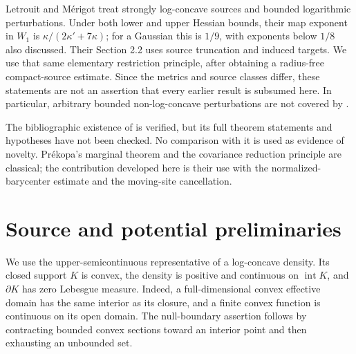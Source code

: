\documentclass[11pt]{article}
\numberwithin{equation}{section}
\theoremstyle{remark}
\newcommand{\interior}{\operatorname{int}}
\begin{document}
Letrouit and M\'erigot \cite[Theorem 1.4]{LetrouitMerigot2026} treat strongly log-concave sources and bounded logarithmic perturbations. Under both lower and upper Hessian bounds, their map exponent in $W_1$ is $\kappa/(2\kappa'+7\kappa)$; for a Gaussian this is $1/9$, with exponents below $1/8$ also discussed. Their Section 2.2 uses source truncation and induced targets. We use that same elementary restriction principle, after obtaining a radius-free compact-source estimate. Since the metrics and source classes differ, these statements are not an assertion that every earlier result is subsumed here. In particular, arbitrary bounded non-log-concave perturbations are not covered by .

The bibliographic existence of \cite{Merigot2026} is verified, but its full theorem statements and hypotheses have not been checked. No comparison with it is used as evidence of novelty. Pr\'ekopa's marginal theorem \cite{Prekopa1973} and the covariance reduction principle \cite{KanterProppe1977} are classical; the contribution developed here is their use with the normalized-barycenter estimate and the moving-site cancellation.

\section{Source and potential preliminaries}\label{sec:prelim}
We use the upper-semicontinuous representative of a log-concave density. Its closed support $K$ is convex, the density is positive and continuous on $\interior K$, and $\partial K$ has zero Lebesgue measure. Indeed, a full-dimensional convex effective domain has the same interior as its closure, and a finite convex function is continuous on its open domain. The null-boundary assertion follows by contracting bounded convex sections toward an interior point and then exhausting an unbounded set.
\end{document}
